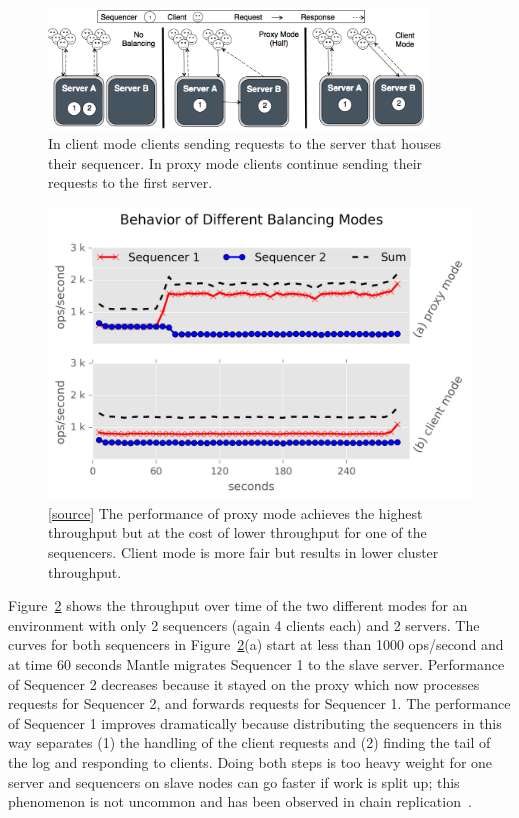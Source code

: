 \begin{figure}[t!]
\centering
\includegraphics[width=0.9\textwidth]{./chapters/controlplane/malacology/figures/mantle-modes.png}
\caption{ In client mode clients sending requests to the server that houses
their sequencer. In proxy mode clients continue sending their requests to the
first server.  }\label{fig:mantle-modes}
\end{figure}

\begin{figure}[t!]
\centering
\includegraphics{./chapters/controlplane/malacology/figures/mantle-mode-behavior.png}
\caption{
[\href{https://github.com/michaelsevilla/malacology-popper/blob/v2.1/experiments/mds-zlog-seq-migrate-redux-waves/results-paper/visualize.ipynb}{source}]
The performance of proxy mode achieves the highest throughput but at the cost
of lower throughput for one of the sequencers. Client mode is more fair but
results in lower cluster throughput.  }\label{fig:mantle-mode-behavior}
\end{figure}

Figure~\ref{fig:mantle-mode-behavior} shows the throughput over time of the two
different modes for an environment with only 2 sequencers (again 4 clients
each) and 2 servers. The curves for both sequencers in
Figure~\ref{fig:mantle-mode-behavior}(a) start at less than 1000 ops/second and
at time 60 seconds Mantle migrates Sequencer 1 to the slave server.
Performance of Sequencer 2 decreases because it stayed on the proxy which now
processes requests for Sequencer 2, and forwards requests for Sequencer 1. The
performance of Sequencer 1 improves dramatically because distributing the
sequencers in this way separates (1) the handling of the client requests and
(2) finding the tail of the log and responding to clients.  Doing both steps is
too heavy weight for one server and sequencers on slave nodes can go faster if
work is split up; this phenomenon is not uncommon and has been observed in
chain replication~\cite{chain_rep}.

